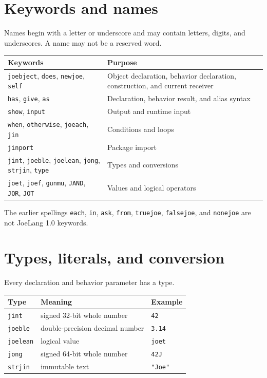 \documentclass[11pt]{article}
\newcommand{\keyword}[1]{\texttt{#1}}
\begin{document}
\section{Keywords and names}
Names begin with a letter or underscore and may contain letters, digits, and underscores. A name may not be a reserved word.

\begin{longtable}{p{}p{}}
\toprule
\textbf{Keywords} & \textbf{Purpose} \\
\midrule
\endhead
\keyword{joebject}, \keyword{does}, \keyword{newjoe}, \keyword{self} & Object declaration, behavior declaration, construction, and current receiver \\
\keyword{has}, \keyword{give}, \keyword{as} & Declaration, behavior result, and alias syntax \\
\keyword{show}, \keyword{input} & Output and runtime input \\
\keyword{when}, \keyword{otherwise}, \keyword{joeach}, \keyword{jin} & Conditions and loops \\
\keyword{jinport} & Package import \\
\keyword{jint}, \keyword{joeble}, \keyword{joelean}, \keyword{jong}, \keyword{strjin}, \keyword{type} & Types and conversions \\
\keyword{joet}, \keyword{joef}, \keyword{gunmu}, \keyword{JAND}, \keyword{JOR}, \keyword{JOT} & Values and logical operators \\
\bottomrule
\end{longtable}

The earlier spellings \keyword{each}, \keyword{in}, \keyword{ask}, \keyword{from}, \keyword{truejoe}, \keyword{falsejoe}, and \keyword{nonejoe} are not JoeLang 1.0 keywords.

\section{Types, literals, and conversion}
Every declaration and behavior parameter has a type.

\begin{center}
\begin{tabular}{lll}
\toprule
Type & Meaning & Example \\
\midrule
\keyword{jint} & signed 32-bit whole number & \keyword{42} \\
\keyword{joeble} & double-precision decimal number & \keyword{3.14} \\
\keyword{joelean} & logical value & \keyword{joet} \\
\keyword{jong} & signed 64-bit whole number & \keyword{42J} \\
\keyword{strjin} & immutable text & \keyword{"Joe"} \\
\bottomrule
\end{tabular}
\end{center}
\end{document}
